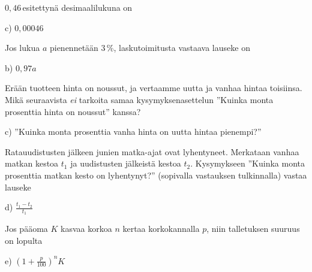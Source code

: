 \begin{multicols}{2}
\begin{tehtava}
$0,46$\,\permil\;esitettynä desimaalilukuna on
	\begin{vastaus}
	c) $0,00046$
	\end{vastaus}
\end{tehtava}

\begin{tehtava}
Jos lukua $a$ pienennetään $3$\,\%, laskutoimitusta vastaava lauseke on
	\begin{vastaus}
b) $0,97a$
	\end{vastaus}
\end{tehtava}

\begin{tehtava}
Erään tuotteen hinta on noussut, ja vertaamme uutta ja vanhaa hintaa toisiinsa. Mikä seuraavista \textit{ei} tarkoita samaa kysymyksenasettelun ''Kuinka monta prosenttia hinta on noussut'' kanssa?
	\begin{vastaus}
c) ''Kuinka monta prosenttia vanha hinta on uutta hintaa pienempi?''
	\end{vastaus}
\end{tehtava}

\begin{tehtava}
Ratauudistusten jälkeen junien matka-ajat ovat lyhentyneet. Merkataan vanhaa matkan kestoa $t_1$ ja uudistusten jälkeistä kestoa $t_2$. Kysymykseen ''Kuinka monta prosenttia matkan kesto on lyhentynyt?'' (sopivalla vastauksen tulkinnalla) vastaa lauseke
	\begin{vastaus}
d) $\frac{t_1-t_2}{t_1}$
	\end{vastaus}
\end{tehtava}

\begin{tehtava}
Jos pääoma $K$ kasvaa korkoa $n$ kertaa korkokannalla $p$, niin talletuksen suuruus on lopulta
	\begin{vastaus}
e) $(1+\frac{p}{100})^nK$
	\end{vastaus}
\end{tehtava}

\end{multicols}

